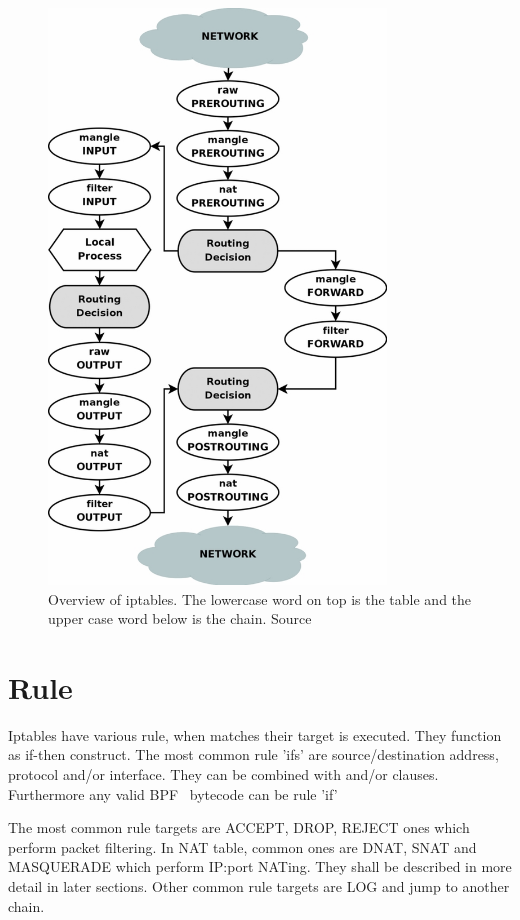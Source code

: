 \documentclass[times, utf8, seminar, english]{fer}
\begin{document}
\begin{figure}
    \centering
    \includegraphics[width=0.8\textwidth]{tables_traverse}
    \caption{Overview of iptables. The lowercase word on top is the table and the upper case word below is the chain. Source~\cite{Iptables99:online}}
    \label{fig:iptables_traverse}
\end{figure}

\section{Rule}
    Iptables have various rule, when matches their target is executed. They function as if-then construct. The most common rule 'ifs' are source/destination address, protocol and/or interface. They can be combined with and/or clauses. Furthermore any valid BPF~\cite{BPFthefo6:online} bytecode can be rule 'if'

    The most common rule targets are ACCEPT, DROP, REJECT ones which perform packet filtering. In NAT table, common ones are DNAT, SNAT and MASQUERADE which perform IP:port NATing. They shall be described in more detail in later sections. Other common rule targets are LOG and jump to another chain.
\end{document}
